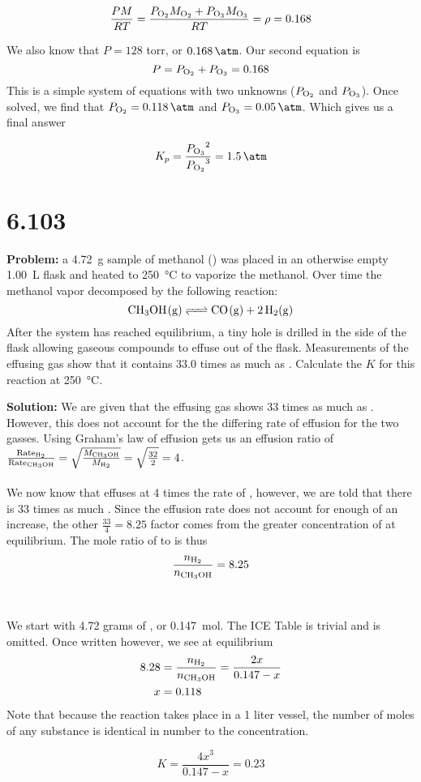 \documentclass[11 pt]{article}
\begin{document}
 $$ \frac{PM}{RT} = \frac{P_{\ce{O2}}M_{\ce{O2}} + P_{\ce{O3}}M_{\ce{O3}}}{RT} = \rho = 0.168 $$

We also know that $P = 128$ torr, or $\SI{.168}{\atm}$. Our second equation is $$P = P_{\ce{O2}} + P_{\ce{O3}} = 0.168$$
This is a simple system of equations with two unknowns ($P_{\ce{O2}}$ and $P_{\ce{O3}}$). Once solved, we find that
$P_{\ce{O2}} = \SI{0.118}{\atm}$ and $P_{\ce{O3}} = \SI{0.05}{\atm}$. Which gives us a final answer
\begin{answerBox}
$$K_p = \frac{{P_{\ce{O3}}}^2}{{P_{\ce{O2}}}^3} = \SI{1.5}{\per\atm}$$
\end{answerBox}
\newpage
\section*{6.103}
\begin{problemBox}
    \textbf{Problem:} a \SI{4.72}{\gram} sample of methanol () was placed in an otherwise empty \SI{1.00}{\liter} flask and heated to
    \SI{250}{\celsius} to vaporize the methanol. Over time the methanol vapor decomposed by the following reaction:
    $$\ce{CH3OH(g) <=> CO(g) + 2H2(g)}$$ After the system has reached equilibrium, a tiny hole is drilled in the side of the flask
    allowing gaseous compounds to effuse out of the flask. Measurements of the effusing gas show that it contains
    33.0 times as much  as . Calculate the $K$ for this reaction at \SI{250}{\celsius}. 
\end{problemBox}
\textbf{Solution:} We are given that the effusing gas shows 33 times as much  as . However, this
does not account for the the differing rate of effusion for the two gasses. Using Graham's law of effusion gets us an
effusion ratio of
$\frac{\text{Rate}_{\ce{H2}}}{\text{Rate}_{\ce{CH3OH}}} = \sqrt{\frac{M_{\ce{CH3OH}}}{M_{\ce{H2}}}} = \sqrt{\frac{32}{2}} = 4$. \\ \\
We now know that  effuses at 4 times the rate of , however, we are told that there is 33 times as much . Since the effusion
rate does not account for enough of an increase, the other $\frac{33}{4} = 8.25$ factor comes from the greater concentration of  at equilibrium.
The mole ratio of  to  is thus $$\frac{n_{\ce{H2}}}{n_{\ce{CH3OH}}} = 8.25 $$\\ \\
We start with 4.72 grams of , or \SI{0.147}{\mole}. The ICE Table is trivial and is omitted. Once written however,
we see at equilibrium 
\begin{align*}
  8.28 &= \frac{n_{\ce{H2}}}{n_{\ce{CH3OH}}} = \frac{2x}{0.147 - x} \\
  x &= 0.118
\end{align*}
Note that because the reaction takes place in a 1 liter vessel, the number of moles of any substance is identical
in number to the concentration. 
\begin{answerBox}
    $$K = \frac{4x^3}{0.147 - x} = 0.23$$
\end{answerBox}
\end{document}

